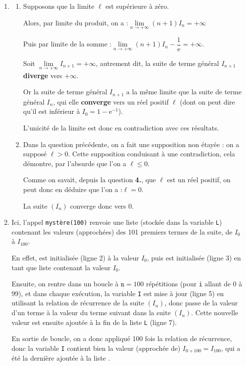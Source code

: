 \documentclass[10pt]{article}
\providecommand{\e}{{\mathrm{e}}}
\begin{document}
\begin{enumerate}
On arrive bien à la relation de récurrence annoncée.

\item 
	\begin{enumerate}
		\item Supposons que la limite $\ell$ est supérieure à zéro.

Alors, par limite du produit, on a :\quad $\lim\limits_{n \to +\infty} (n+1)I_n = +\infty$

		Puis par limite de la somme :\quad $\lim\limits_{n \to +\infty} (n+1)I_n - \dfrac{1}{\e}= +\infty$.

Soit \quad $\lim\limits_{n \to +\infty} I_{n + 1} =+\infty$, \quad autrement dit, la suite de terme général $I_{n+1}$ \textbf{diverge} vers $+\infty$.

Or la suite de terme général $I_{n+1}$ a la même limite que la suite de terme général $I_n$, qui elle \textbf{converge} vers un réel positif $\ell$ (dont on peut dire qu'il est inférieur à $I_0 = 1 - \e^{-1}$).

L'unicité de la limite est donc en contradiction avec ces résultats.

		\item Dans la question précédente, on a fait une supposition non étayée : on a supposé $\ell > 0$. Cette supposition conduisant à une contradiction, cela démontre, par l'absurde que l'on a $\ell \leqslant 0$.

Comme on savait, depuis la question \textbf{4.}, que $\ell$ est un réel positif, on peut donc en déduire que l'on a :\quad$\ell = 0$.

La suite $(I_n)$ converge donc vers 0.
	\end{enumerate}
	\item Ici, l'appel \texttt{mystère(100)} renvoie une liste (stockée dans la variable \texttt{L}) contenant les valeurs (approchées) des 101 premiers termes de la suite, de $I_0$ à $I_{100}$.

En effet,  est initialisée (ligne 2) à la valeur $I_0$, puis  est initialisée (ligne 3) en tant que liste contenant la valeur $I_0$.

Ensuite, on rentre dans un boucle à $\texttt{n} = 100$ répétitions (pour \texttt{i} allant de 0 à 99), et dans chaque exécution, la variable \texttt{I} est mise à jour (ligne 5) en utilisant la relation de récurrence de la suite $(I_n)$, donc passe de la valeur d'un terme à la valeur du terme suivant dans la suite $(I_n)$. Cette nouvelle valeur est ensuite ajoutée à la fin de la liste \texttt{L} (ligne 7).

En sortie de boucle, on a donc appliqué 100 fois la relation de récurrence, donc la variable \texttt{I} contient bien la valeur (approchée de) $I_{0 + 100} = I_{100}$, qui a été la dernière ajoutée à la liste .
\end{enumerate}
\medskip
\end{document}
